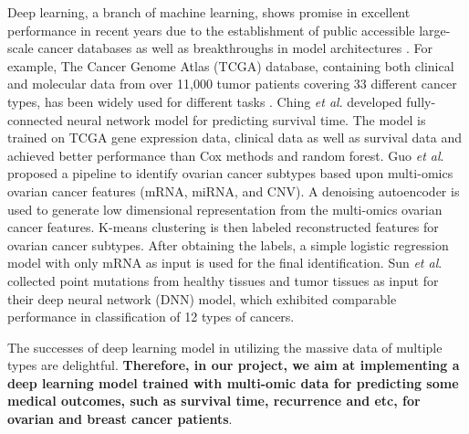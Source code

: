 \documentclass{article}
\begin{document}
Deep learning, a branch of machine learning, shows promise in excellent performance in recent years due to the establishment of public accessible large-scale cancer databases as well as breakthroughs in model architectures \cite[]{zhu2020application}. For example, The Cancer Genome Atlas (TCGA) database, containing both clinical and molecular data from over 11,000 tumor patients covering 33 different cancer types, has been widely used for different tasks \cite[]{tomczak2015cancer}. Ching \textit{et al}.\cite[]{ching2018cox} developed fully-connected neural network model for predicting survival time. The model is trained on TCGA gene expression data, clinical data as well as survival data and achieved better performance than Cox methods and random forest. Guo \textit{et al}.\cite[]{guo2020deep} proposed a pipeline to identify ovarian cancer subtypes based upon multi-omics ovarian cancer features (mRNA, miRNA, and CNV). A denoising autoencoder is used to generate low dimensional representation from the multi-omics ovarian cancer features. K-means clustering is then labeled reconstructed features for ovarian cancer subtypes. After obtaining the labels, a simple logistic regression model with only mRNA as input is used for the final identification. Sun \textit{et al}.\cite[]{sun2019identification} collected point mutations from healthy tissues and tumor tissues as input for their deep neural network (DNN) model, which exhibited comparable performance in classification of 12 types of cancers.

The successes of deep learning model in utilizing the massive data of multiple types are delightful. \textbf{Therefore, in our project, we aim at implementing a deep learning model trained with multi-omic data for predicting some medical outcomes, such as survival time, recurrence and etc, for ovarian and breast cancer patients}. 




\end{document}

